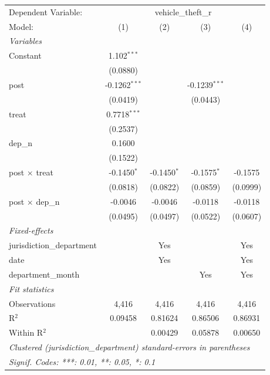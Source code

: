 \begingroup
\centering
\begin{tabular}{lcccc}
   \tabularnewline \midrule \midrule
   Dependent Variable: & \multicolumn{4}{c}{vehicle\_theft\_r}\\
   Model:                    & (1)             & (2)           & (3)             & (4)\\  
   \midrule
   \emph{Variables}\\
   Constant                  & 1.102$^{***}$   &               &                 &   \\   
                             & (0.0880)        &               &                 &   \\   
   post                      & -0.1262$^{***}$ &               & -0.1239$^{***}$ &   \\   
                             & (0.0419)        &               & (0.0443)        &   \\   
   treat                     & 0.7718$^{***}$  &               &                 &   \\   
                             & (0.2537)        &               &                 &   \\   
   dep\_n                    & 0.1600          &               &                 &   \\   
                             & (0.1522)        &               &                 &   \\   
   post $\times$ treat       & -0.1450$^{*}$   & -0.1450$^{*}$ & -0.1575$^{*}$   & -0.1575\\   
                             & (0.0818)        & (0.0822)      & (0.0859)        & (0.0999)\\   
   post $\times$ dep\_n      & -0.0046         & -0.0046       & -0.0118         & -0.0118\\   
                             & (0.0495)        & (0.0497)      & (0.0522)        & (0.0607)\\   
   \midrule
   \emph{Fixed-effects}\\
   jurisdiction\_department  &                 & Yes           &                 & Yes\\  
   date                      &                 & Yes           &                 & Yes\\  
   department\_month         &                 &               & Yes             & Yes\\  
   \midrule
   \emph{Fit statistics}\\
   Observations              & 4,416           & 4,416         & 4,416           & 4,416\\  
   R$^2$                     & 0.09458         & 0.81624       & 0.86506         & 0.86931\\  
   Within R$^2$              &                 & 0.00429       & 0.05878         & 0.00650\\  
   \midrule \midrule
   \multicolumn{5}{l}{\emph{Clustered (jurisdiction\_department) standard-errors in parentheses}}\\
   \multicolumn{5}{l}{\emph{Signif. Codes: ***: 0.01, **: 0.05, *: 0.1}}\\
\end{tabular}
\par\endgroup
